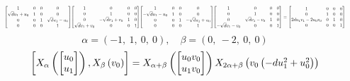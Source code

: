 \documentclass[11pt]{article}
\theoremstyle{definition}
\begin{document}
\[
\scaletoalign{\textwidth}{{\left[\begin{matrix}1 & 0 & 0 & 0\\\sqrt{d} u_{1} + u_{0} & 1 & 0 & 0\\0 & 0 & 1 & \sqrt{d} u_{1} - u_{0}\\0 & 0 & 0 & 1\end{matrix}\right]} {\left[\begin{matrix}1 & 0 & 0 & 0\\0 & 1 & 0 & 0\\0 & - \sqrt{d} v_{1} + v_{0} & 1 & 0\\\sqrt{d} v_{1} + v_{0} & 0 & 0 & 1\end{matrix}\right]} {\left[\begin{matrix}1 & 0 & 0 & 0\\- \sqrt{d} u_{1} - u_{0} & 1 & 0 & 0\\0 & 0 & 1 & - \sqrt{d} u_{1} + u_{0}\\0 & 0 & 0 & 1\end{matrix}\right]} {\left[\begin{matrix}1 & 0 & 0 & 0\\0 & 1 & 0 & 0\\0 & \sqrt{d} v_{1} - v_{0} & 1 & 0\\- \sqrt{d} v_{1} - v_{0} & 0 & 0 & 1\end{matrix}\right]} = {\left[\begin{matrix}1 & 0 & 0 & 0\\0 & 1 & 0 & 0\\2 d u_{1} v_{1} - 2 u_{0} v_{0} & 0 & 1 & 0\\0 & 0 & 0 & 1\end{matrix}\right]}}
\]
\[
\alpha = \left( -1, \  1, \  0, \  0\right), \quad \beta = \left( 0, \  -2, \  0, \  0\right)
\]
\[
\scaletoalign{\textwidth}{\left[ X_{\alpha}\left(\left[\begin{matrix}u_{0}\\u_{1}\end{matrix}\right]\right), X_{\beta}\left(v_{0}\right) \right] = X_{\alpha + \beta}\left(\left[\begin{matrix}u_{0} v_{0}\\u_{1} v_{0}\end{matrix}\right]\right) X_{2\alpha + \beta}\left(v_{0} \left(- d u_{1}^{2} + u_{0}^{2}\right)\right)}
\]
\end{document}
